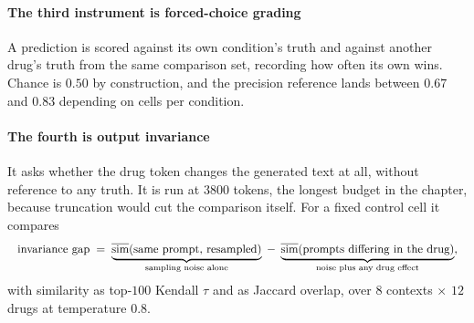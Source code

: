 \paragraph{The third instrument is forced-choice grading} A prediction is scored
against its own condition's truth and against another drug's truth from the same
comparison set, recording how often its own wins. Chance is $0.50$ by
construction, and the precision reference lands between $0.67$ and $0.83$
depending on cells per condition.

\paragraph{The fourth is output invariance} It asks whether the drug token
changes the generated text at all, without reference to any truth. It is run at
$3800$ tokens, the longest budget in the chapter, because
truncation would cut the comparison
itself. For
a fixed control cell it compares
\begin{equation}
\resizebox{\linewidth}{!}{$\displaystyle
 \textrm{invariance gap} \;=\;
 \underbrace{\overline{\textrm{sim}}(\textrm{same prompt, resampled})}%
   _{\textrm{sampling noise alone}}
 \;-\; \underbrace{\overline{\textrm{sim}}(\textrm{prompts differing in the
   drug})}_{\textrm{noise plus any drug effect}},
$}
\end{equation}
with similarity as top-$100$ Kendall $\tau$ and as Jaccard overlap, over $8$
contexts $\times$ $12$ drugs at temperature $0.8$.

